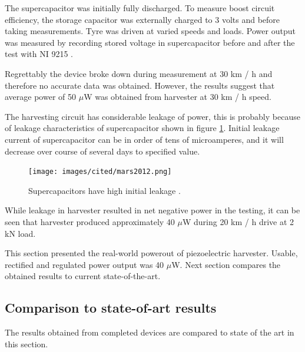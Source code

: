 The supercapacitor was initially fully discharged. To measure boost circuit efficiency, the storage capacitor was externally charged to 3 volts and before taking measurements. Tyre was driven at varied speeds and loads. Power output was measured by recording stored voltage in supercapacitor before and after the test with NI 9215 \cite{ni9215}.

\begin{table}[htb]
\caption{\label{tbl:piezo_harvester_tyre_output} Measured values from tyre test setup.}
\begin{center}
\end{center}
\end{table}

Regrettably the device broke down during measurement at 30 km / h and therefore no accurate data was obtained. However, the results suggest that average power of 50 $\mu$W was obtained from harvester at 30 km / h speed.

The harvesting circuit has considerable leakage of power, this is probably because of leakage characteristics of supercapacitor shown in figure \ref{fig:scap_leakage}. Initial leakage current of supercapacitor can be in order of tens of microamperes, and it will decrease over course of several days to specified value.

\begin{figure}[htb]
\begin{center}
\texttt{[image: images/cited/mars2012.png]}
\end{center}
\caption{\label{fig:scap_leakage} Supercapacitors have high initial leakage \cite{Mars2012}.}
\end{figure}

While leakage in harvester resulted in net negative power in the testing, it can be seen that harvester produced approximately 40 $\mu$W during 20 km / h drive at 2 kN load.

This section presented the real-world powerout of piezoelectric harvester. Usable, rectified and regulated power output was 40 $\mu$W. Next section compares the obtained results to current state-of-the-art.

\subsection{Comparison to state-of-art results}
The results obtained from completed devices are compared to state of the art in this section.
